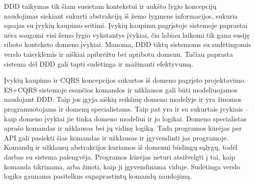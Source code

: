DDD taikymas tik šiam susietam kontekstui ir aukšto lygio koncepcijų naudojimas siekiant sukurti abstrakciją iš žemo lygmens informacijos, sukuria sąsajas su įvykių kaupimo sritimi. Įvykių kaupimu pagrįstoje sistemoje paprastai nėra saugomi visi žemo lygio vykstantys įvykiai, čia labiau laikomi tik gana susiję riboto konteksto domeno įvykiai. Manoma, DDD tiktų sistemoms su sudėtingomis verslo taisyklėmis ir aiškiai apibrėžtu bei apribotu domenu. Tačiau paprasta sistema dėl DDD gali tapti sudėtinga ir mažinanti efektyvumą.

Įvykių kaupimo ir CQRS koncepcijos sukurtos iš domeno pagrįsto projektavimo. ES+CQRS sistemoje esančios komandos ir užklausos gali būti modeliuojamos naudojant DDD. Taip jos įgyja aiškią reikšmę domeno modelyje ir yra žinomos programuotojams ir domenų specialistams. Taip pat yra ir su sukurtais įvykiais – kaip domeno įvykiai jie tinka domeno modeliui ir jo logikai. Domeno specialistas aprašo komandas ir užklausas bei jų vidinę logiką. Tada programos kūrėjas per API gali pasiekti šias komandas ir užklausas ir įgyvendinti jas programoje. Komandų ir užklausų abstrakcijos kuriamos iš domenui būdingų sąlygų, todėl darbas su sistema palengvėja. Programos kūrėjas neturi atsižvelgti į tai, kaip komanda tikrinama, arba žinoti, kaip ji įgyvendinama viduje. Sudėtinga verslo logika gaunama pasitelkus supaprastintų komandų naudojimą.
